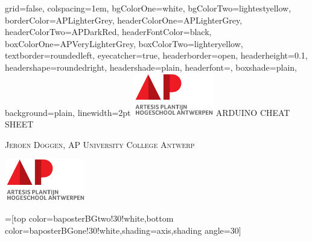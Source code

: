 \documentclass[landscape,final,a0paper]{baposter}
\begin{document}
\newlength{\leftimgwidth}
\begin{poster}%
  {
  grid=false, %
  colspacing=1em, %
  bgColorOne=white,
  bgColorTwo=lightestyellow,
  borderColor=APLighterGrey,
  headerColorOne=APLighterGrey,
  headerColorTwo=APDarkRed,
  headerFontColor=black,
  boxColorOne=APVeryLighterGrey,
  boxColorTwo=lighteryellow,
  textborder=roundedleft,
  eyecatcher=true,
  headerborder=open,
  headerheight=0.1\textheight,
  headershape=roundedright,
  headershade=plain,
  headerfont=\Large\textsf, %
  boxshade=plain,
  background=plain,
  linewidth=2pt
  }
  {
  \includegraphics[height=5em]{AP.png}
  } %
  {\sf %
  ARDUINO CHEAT SHEET}
  {\sf %
  \vspace{0.05em}
  \textsc{Jeroen Doggen, AP University College Antwerp}


  }
  {
    \includegraphics[height=5em]{AP.png} %
  }

  =[top color=baposterBGtwo!30!white,bottom color=baposterBGone!30!white,shading=axis,shading angle=30]

     \setlength{\leftimgwidth}{0.78em+8.0em}

    \newcommand{\colouredcircle}[1]{%
      \tikz{\useasboundingbox (-0.2em,-0.32em) rectangle(0.2em,0.32em); \draw[draw=black,fill=baposterBGone!80!black!#1!white,line width=0.03em] (0,0) circle(0.18em);}}


\end{poster}
\end{document}

